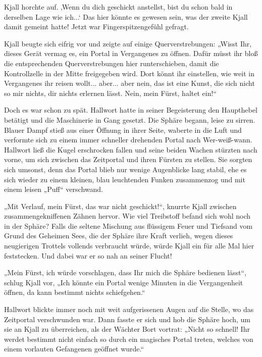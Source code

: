 Kjall horchte auf. ‚Wenn du dich geschickt anstellst, bist du schon bald in derselben Lage wie ich...‘ Das hier könnte es gewesen sein, was der zweite Kjall damit gemeint hatte! Jetzt war Fingerspitzengefühl gefragt.

Kjall beugte sich eifrig vor und zeigte auf einige Querverstrebungen: „Wisst Ihr, dieses Gerät vermag es, ein Portal in Vergangenes zu öffnen. Dafür müsst ihr bloß die entsprechenden Querverstrebungen hier runterschieben, damit die Kontrollzelle in der Mitte freigegeben wird. Dort könnt ihr einstellen, wie weit in Vergangenes ihr reisen wollt... aber... aber nein, das ist eine Kunst, die sich nicht so mir nichts, dir nichts erlernen lässt. Nein, mein Fürst, haltet ein!“

Doch es war schon zu spät. Hallwort hatte in seiner Begeisterung den Haupthebel betätigt und die Maschinerie in Gang gesetzt. Die Sphäre begann, leise zu sirren. Blauer Dampf stieß aus einer Öffnung in ihrer Seite, waberte in die Luft und verformte sich zu einem immer schneller drehenden Portal nach Wer-weiß-wann. Hallwort ließ die Kugel erschrocken fallen und seine beiden Wachen stürzten nach vorne, um sich zwischen das Zeitportal und ihren Fürsten zu stellen. Sie sorgten sich umsonst, denn das Portal blieb nur wenige Augenblicke lang stabil, ehe es sich wieder zu einem kleinen, blau leuchtenden Funken zusammenzog und mit einem leisen „Puff“ verschwand.

„Mit Verlauf, mein Fürst, das war nicht geschickt!“, knurrte Kjall zwischen zusammengekniffenen Zähnen hervor. Wie viel Treibstoff befand sich wohl noch in der Sphäre? Falls die seltene Mischung aus flüssigem Feuer und Tiefsand vom Grund des Geheimen Sees, die der Sphäre ihre Kraft verlieh, wegen dieses neugierigen Trottels vollends verbraucht würde, würde Kjall ein für alle Mal hier feststecken. Und dabei war er so nah an seiner Flucht!

„Mein Fürst, ich würde vorschlagen, dass Ihr mich die Sphäre bedienen lässt“, schlug Kjall vor, „Ich könnte ein Portal wenige Minuten in die Vergangenheit öffnen, da kann bestimmt nichts schiefgehen.“

Hallwort blickte immer noch mit weit aufgerissenen Augen auf die Stelle, wo das Zeitportal verschwunden war. Dann fasste er sich und hob die Sphäre hoch, um sie an Kjall zu überreichen, als der Wächter Bort vortrat: „Nicht so schnell! Ihr werdet bestimmt nicht einfach so durch ein magisches Portal treten, welches von einem vorlauten Gefangenen geöffnet wurde.“

